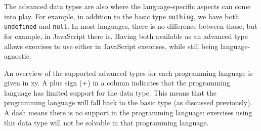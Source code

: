 \documentclass[../main]{subfiles}
\begin{document}
The advanced data types are also where the language-specific aspects can come into play.
For example, in addition to the basic type \texttt{nothing}, we have both \texttt{undefined} and \texttt{null}.
In most languages, there is no difference between those, but for example, in JavaScript there is.
Having both available as an advanced type allows exercises to use either in JavaScript exercises, while still being language-agnostic.

An overview of the supported advanced types for each programming language is given in xy.
A plus sign (+) in a column indicates that the programming language has limited support for the data type.
This means that the programming language will fall back to the basic type (as discussed previously).
A dash means there is no support in the programming language: exercises using this data type will not be solvable in that programming language.
\end{document}
